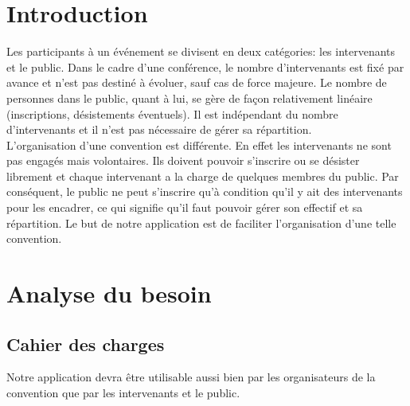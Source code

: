 \documentclass[11pt]{article}
\begin{document}
\renewcommand{\contentsname}{Sommaire}
\tableofcontents
\newpage



\section*{Introduction}

Les participants à un événement se divisent en deux catégories: les intervenants et le public. Dans le cadre d'une conférence, le nombre d'intervenants est fixé par avance et n'est pas destiné à évoluer, sauf cas de force majeure. Le nombre de personnes dans le public, quant à lui, se gère de façon relativement linéaire (inscriptions, désistements éventuels). Il est indépendant du nombre d'intervenants et il n'est pas nécessaire de gérer sa répartition.\\

L'organisation d'une convention est différente. En effet les intervenants ne sont pas engagés mais volontaires. Ils doivent pouvoir s'inscrire ou se désister librement et chaque intervenant a la charge de quelques membres du public. Par conséquent, le public ne peut s'inscrire qu'à condition qu'il y ait des intervenants pour les encadrer, ce qui signifie qu'il faut pouvoir gérer son effectif et sa répartition. Le but de notre application est de faciliter l'organisation d'une telle convention. \\



\newpage


\section{Analyse du besoin}

\subsection{Cahier des charges}
Notre application devra être utilisable aussi bien par les organisateurs de la convention que par les intervenants et le public.  \\
\end{document}
